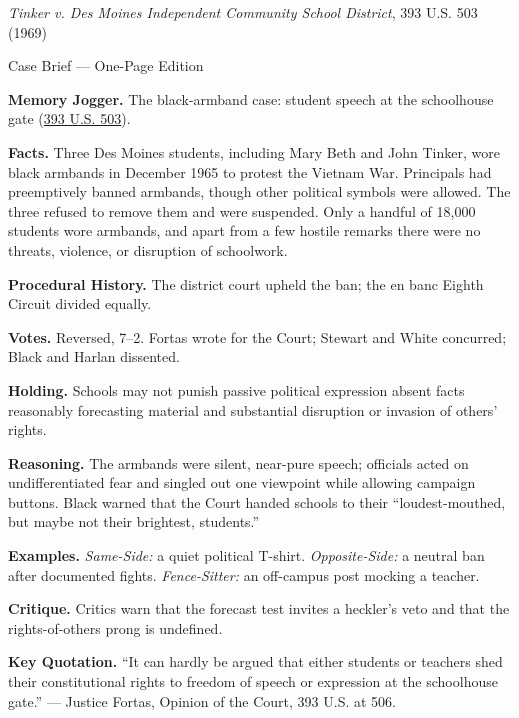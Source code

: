\documentclass[12pt]{article}
\begin{document}
\begin{center}
{\Large \textit{Tinker v. Des Moines Independent Community School District}, 393 U.S. 503 (1969)\par}
\vspace{0.3em}
{\normalsize Case Brief --- One-Page Edition\par}
\end{center}

\textbf{Memory Jogger.} The black-armband case: student speech at the schoolhouse gate (\href{https://supreme.justia.com/cases/federal/us/393/503/}{393 U.S. 503}).

\textbf{Facts.} Three Des Moines students, including Mary Beth and John Tinker, wore black armbands in December 1965 to protest the Vietnam War. Principals had preemptively banned armbands, though other political symbols were allowed. The three refused to remove them and were suspended. Only a handful of 18,000 students wore armbands, and apart from a few hostile remarks there were no threats, violence, or disruption of schoolwork.

\textbf{Procedural History.} The district court upheld the ban; the en banc Eighth Circuit divided equally.

\textbf{Votes.} Reversed, 7--2. Fortas wrote for the Court; Stewart and White concurred; Black and Harlan dissented.

\textbf{Holding.} Schools may not punish passive political expression absent facts reasonably forecasting material and substantial disruption or invasion of others' rights.

\textbf{Reasoning.} The armbands were silent, near-pure speech; officials acted on undifferentiated fear and singled out one viewpoint while allowing campaign buttons. Black warned that the Court handed schools to their ``loudest-mouthed, but maybe not their brightest, students.''

\textbf{Examples.} \emph{Same-Side:} a quiet political T-shirt. \emph{Opposite-Side:} a neutral ban after documented fights. \emph{Fence-Sitter:} an off-campus post mocking a teacher.

\textbf{Critique.} Critics warn that the forecast test invites a heckler's veto and that the rights-of-others prong is undefined.

\textbf{Key Quotation.} ``It can hardly be argued that either students or teachers shed their constitutional rights to freedom of speech or expression at the schoolhouse gate.'' --- Justice Fortas, Opinion of the Court, 393 U.S. at 506.
\end{document}
